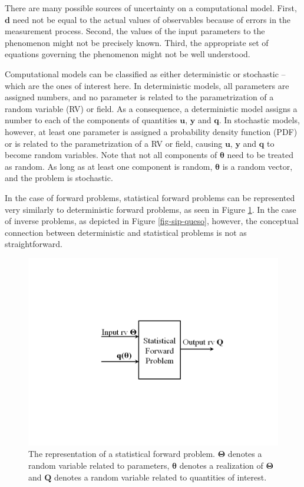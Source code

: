There are many possible sources of uncertainty on a computational model. %
First, $\mathbf{d}$ need not be equal to the actual values of observables because of errors in the measurement process. Second, the values of the input parameters to the phenomenon might not be precisely known. Third, the appropriate set of
equations governing the phenomenon might not be well understood. 

Computational models can be classified as either deterministic or stochastic -- which are the ones of interest here.  In deterministic models, all parameters are assigned numbers, and no parameter is related to the parametrization of a random variable (RV) or field. As a
consequence, a deterministic model assigns a number to each of the components of quantities $\mathbf{u}$, $\mathbf{y}$ and $\mathbf{q}$. In stochastic models, however, at least one parameter is assigned a probability density function (PDF) or is related to the parametrization of a RV or field, causing $\mathbf{u}$, $\mathbf{y}$ and $\mathbf{q}$ to become random variables.  Note that not all components of $\boldsymbol{\theta}$ need to be treated as random. As long as at least one component is random, $\boldsymbol{\theta}$ is a random vector, and the problem is stochastic.



In the case of forward problems, statistical forward problems can be represented very similarly to deterministic forward problems,
as seen in Figure \ref{fig-sfp-queso}.
In the case of inverse problems, as depicted in Figure \ref{fig-sip-queso}, however, the conceptual connection between deterministic and statistical problems
is not as straightforward.

\begin{figure}[h!]
\centerline{
\includegraphics[scale=0.45,clip=true,viewport=1.0in 2.5in 10.0in 5.5in]{figs/queso_paper1_09}
}
\caption{
The representation of a statistical forward problem.
$\boldsymbol{\Theta}$ denotes a random variable related to parameters,
$\boldsymbol{\theta}$ denotes a realization of $\boldsymbol{\Theta}$ and
$\mathbf{Q}$ denotes a random variable related to quantities of interest.
}
\label{fig-sfp-queso}
\end{figure}

